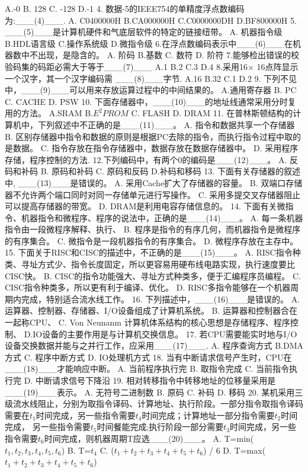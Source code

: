 A.-0    B. 128   C. -128  D.-1
4. 数据-5的IEEE754的单精度浮点数编码为:\_\_\_(4)\_\_\_.
A. C0400000H B.CA000000H C.C0000000DH D.BF800000H
5. \_\_\_(5)\_\_\_是计算机硬件和气底层软件的特定的链接纽带。
A. 机器指令级   B.HDL语言级   C.操作系统级   D.微指令级
6.在浮点数编码表示中\_\_\_(6)\_\_\_在机器数中不出现，是隐含的。
A. 阶码  B.基数   C. 数符   D. 阶符
7.能够检出错误的校验码集的码距必需大于等于\_\_\_(7)\_\_\_
A.1    B.2   C.3   D.4
8.采用16$\times$ 16点阵显示一个汉字，其一个汉字编码需 \_\_\_(8)\_\_\_字节.
A.16 B.32  C.1  D.2
9. 下列不见中，\_\_\_(9)\_\_\_可以用来存放运算过程中的中间结果的。
A.通用寄存器 B. PC   C. CACHE   D. PSW
10. 下面存储器中，\_\_\_(10)\_\_\_的地址线通常采用分时复用的方法。
A.SRAM  B.$E^2PROM$ C. FLASH D. DRAM
11. 在普林斯顿结构的计算机中，下列叙述中不正确的是\_\_\_(11)\_\_\_。
A. 指令和数据共享一个存储器
B. 区别存储器中指令和数据的原则是根据PC去除的指令，而执行指令过程中取的是数据。
C. 指令存放在指令存储器中，数据存放在数据存储器中。
D. 采用程序存储，程序控制的方法.
12.下列编码中，有两个0的编码是\_\_\_(12)\_\_\_。
A. 反码和补码  B. 原码和补码  C.  原码和反码  D.补码和移码
13. 下面有关存储器的叙述中, \_\_\_(13)\_\_\_是错误的。
A. 采用Cache扩大了存储器的容量。
B. 双端口存储器不允许两个端口同时对同一存储单元进行写操作。
C. 采用多提交叉存储器阻止可以提高存储器的带宽。
D. DRAM是利用电容存储信息的。
14. 下面有关微指令、机器指令和微程序、程序的说法中，正确的是\_\_\_(14)\_\_\_。
A. 每一条机器指令由一段微程序解释、执行、
B. 程序是指令的有序几何，而机器指令是微程序的有序集合。
C. 微指令是一段机器指令的有序集合。
D. 微程序存放在主存中。
15. 下面关于RISC和CISC的描述中，不正确的是\_\_\_(15)\_\_\_。
A. RISC指令种类、寻址方式少、指令长度固定，所以更容易用硬布线电路实现，执行速度要比CISC快。
B. CISC的指令功能强大、寻址方式种类多，便于汇编程序员编程。
C. CISC指令种类多，所以更有利于编译、优化。
D. RISC多指令能够在一个机器周期内完成，特别适合流水线工作。
16. 下列描述中，\_\_\_(16)\_\_\_是错误的。
A. 运算器、控制器、存储器、I/O设备组成了计算机系统。
B. 运算器和控制器合在一起称CPU、
C. Von Neunanm 计算机体系结构的核心思想是存储程序、程序控制、
D.IO设备的主要作用是与计算机交换信息。
17. 若CPU需要能实时地与I/O设备交换数据并能与之并行工作，应采用\_\_\_(17)\_\_\_.
A. 程序查询方式     B.DMA方式   C. 程序中断方式     D. IO处理机方式
18. 当有中断请求信号产生时，CPU在\_\_\_(18)\_\_\_才能响应中断。
A. 当前程序执行完      B. 取指令完成   C. 当前指令执行完  D. 中断请求信号下降沿
19. 相对转移指令中转移地址的位移量采用是\_\_\_(19)\_\_\_表示。
A. 无符号二进制数   B. 原码  C. 补码  D. 移码
20. 某机采用三级流水线阻止，分别为取指令译码、计算地址、执行阶段。一部分指令取指令译码需要在$t_1$时间完成，另一些指令需要$t_4$时间完成；计算地址一部分指令需要$t_2$时间完成， 另一些指令需要$t_5$时间餐能完成;执行阶段一部分需要$t_3$时间完成，另一些指令需要$t_6$时间完成，则机器周期T应选\_\_\_(20)\_\_\_。
A. T=min($t_1,t_2,t_3,t_4,t_5,t_6$)   B. T=$t_4$    
C. ($t_1+t_2+t_3+t_4+t_5+t_6$) / 6  D. T=max($t_1+t_2+t_3+t_4+t_5+t_6$)

